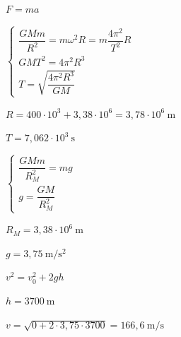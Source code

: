 \begin{solapartat}
 $F = ma$

 $\left\{\begin{array}{l}
\dfrac{GMm}{R^2} = m\omega^2 R = m\dfrac{4\pi^2}{T^2}R\\[2ex]
GMT^2 = 4\pi^2 R^3\\[1ex]
T = \sqrt{\dfrac{4\pi^2 R^3}{GM}}
\end{array}\right.$

 $R = 400\cdot 10^{3} + 3,38\cdot 10^{6} = 3,78\cdot 10^{6}\ \mathrm{m}$

 $T = 7,062\cdot 10^{3}\ \mathrm{s}$
\end{solapartat}

\begin{solapartat}
 $\left\{\begin{array}{l}
\dfrac{GMm}{R_M^2} = mg\\[2ex]
g = \dfrac{GM}{R_M^2}
\end{array}\right.$

 $R_M = 3,38\cdot 10^{6}\ \mathrm{m}$

 $g = 3,75\ \mathrm{m/s^2}$

 $v^2 = v_0^2 + 2gh$

 $h = 3700\ \mathrm{m}$

 $v = \sqrt{0 + 2\cdot 3,75\cdot 3700} = 166,6\ \mathrm{m/s}$
\end{solapartat}
